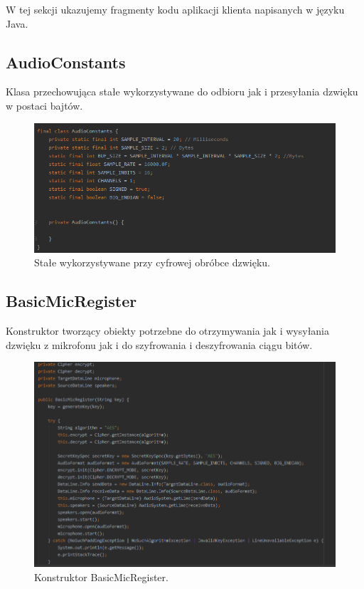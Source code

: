 
W tej sekcji ukazujemy fragmenty kodu aplikacji klienta napisanych w języku Java.

\subsection{AudioConstants}
Klasa przechowująca stałe wykorzystywane do odbioru jak i przesyłania dzwięku w postaci bajtów.

\begin{figure}[H]
	\includegraphics[width=\textwidth]{images/code3_1.png}
	\centering	
	\caption{\centering Stałe wykorzystywane przy cyfrowej obróbce dzwięku.}
\end{figure}


\subsection{BasicMicRegister}
Konstruktor tworzący obiekty potrzebne do otrzymywania jak i wysyłania dzwięku z mikrofonu jak i do szyfrowania i deszyfrowania ciągu bitów.

\begin{figure}[H]
	\includegraphics[width=\textwidth]{images/code4.png}
	\centering	
	\caption{\centering Konstruktor BasicMicRegister.}
\end{figure}


